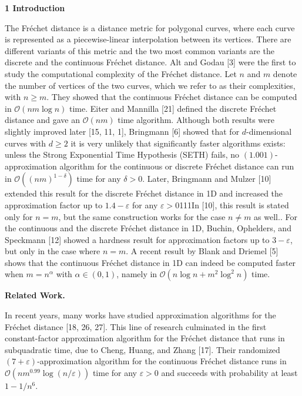 \par\medskip\noindent\textbf{1 Introduction}\par
The Fréchet distance is a distance metric for polygonal curves, where each curve is represented as a piecewise-linear interpolation between its vertices. There are different variants of this metric and the two most common variants are the discrete and the continuous Fréchet distance. Alt and Godau [3] were the first to study the computational complexity of the Fréchet distance. Let $n$ and $m$ denote the number of vertices of the two curves, which we refer to as their complexities, with $n\geq m$. They showed that the continuous Fréchet distance can be computed in $\mathcal{O}(nm\log n)$ time. Eiter and Mannilla [21] defined the discrete Fréchet distance and gave an $\mathcal{O}(nm)$ time algorithm. Although both results were slightly improved later [15, 11, 1], Bringmann [6] showed that for $d$-dimensional curves with $d\geq 2$ it is very unlikely that significantly faster algorithms exists: unless the Strong Exponential Time Hypothesis (SETH) fails, no $(1.001)$-approximation algorithm for the continuous or discrete Fréchet distance can run in $\mathcal{O}((nm)^{1-\delta})$ time for any $\delta>0$. Later, Bringmann and Mulzer [10] extended this result for the discrete Fréchet distance in 1D and increased the approximation factor up to $1.4-\varepsilon$ for any $\varepsilon>0$111In [10], this result is stated only for $n=m$, but the same construction works for the case $n\neq m$ as well.. For the continuous and the discrete Fréchet distance in 1D, Buchin, Ophelders, and Speckmann [12] showed a hardness result for approximation factors up to $3-\varepsilon$, but only in the case where $n=m$. A recent result by Blank and Driemel [5] shows that the continuous Fréchet distance in 1D can indeed be computed faster when $m=n^{\alpha}$ with $\alpha\in(0,1)$, namely in $\mathcal{O}(n\log n+m^{2}\log^{2}n)$ time.
\par
\par
\par\medskip\noindent\textbf{Related Work.}\par
In recent years, many works have studied approximation algorithms for the Fréchet distance [18, 26, 27]. This line of research culminated in the first constant-factor approximation algorithm for the Fréchet distance that runs in subquadratic time, due to Cheng, Huang, and Zhang [17]. Their randomized $(7+\varepsilon)$-approximation algorithm for the continuous Fréchet distance runs in $\mathcal{O}(nm^{0.99}\log(n/\varepsilon))$ time for any $\varepsilon>0$ and succeeds with probability at least $1-1/n^{6}$.

